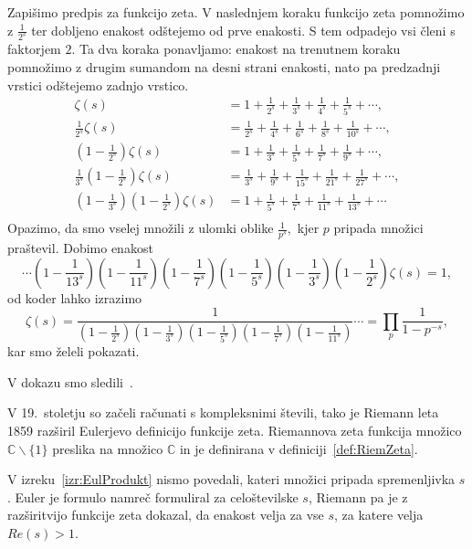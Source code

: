 \documentclass[mat1]{fmfdelo}
\begin{document}
\begin{dokaz}
Zapišimo predpis za funkcijo zeta. V naslednjem koraku funkcijo zeta pomnožimo z $\frac{1}{2^s}$ ter dobljeno enakost odštejemo od prve enakosti. S tem odpadejo vsi členi s faktorjem $2$. Ta dva koraka ponavljamo: enakost na trenutnem koraku pomnožimo z drugim sumandom na desni strani enakosti, nato pa predzadnji vrstici odštejemo zadnjo vrstico.
\begin{align*}
	\zeta(s) &= 1 + \frac{1}{2^s} + \frac{1}{3^s} + \frac{1}{4^s} + \frac{1}{5^s} + \cdots, \nonumber \\
	\frac{1}{2^s} \zeta(s) &= \frac{1}{2^s} + \frac{1}{4^s} + \frac{1}{6^s} + \frac{1}{8^s} + \frac{1}{10^s} + \cdots, \nonumber \\
	\left(1-\frac{1}{2^s}\right) \zeta(s) &= 1 + \frac{1}{3^s} + \frac{1}{5^s} + \frac{1}{7^s} + \frac{1}{9^s} + \cdots, \nonumber \\
	\frac{1}{3^s} \left(1-\frac{1}{2^s}\right) \zeta(s) &= \frac{1}{3^s} + \frac{1}{9^s} + \frac{1}{15^s} + \frac{1}{21^s} + \frac{1}{27^s} + \cdots, \nonumber \\
	\left(1-\frac{1}{3^s}\right)\left (1-\frac{1}{2^s}\right) \zeta(s) &= 1 + \frac{1}{5^s} + \frac{1}{7^s} + \frac{1}{11^s} + \frac{1}{13^s} + \cdots \nonumber \\
\end{align*}
Opazimo, da smo vselej množili z ulomki oblike $\frac{1}{p^s},$ kjer $p$ pripada množici praštevil. Dobimo enakost
	\[ \cdots \left(1-\frac{1}{13^s}\right) \left(1-\frac{1}{11^s}\right) \left(1-\frac{1}{7^s}\right) \left(1-\frac{1}{5^s}\right) \left(1-\frac{1}{3^s}\right) 		\left(1-\frac{1}{2^s}\right) \zeta(s) = 1, \]
od koder lahko izrazimo
	\[ \zeta(s) = \frac{1}{ \left(1-\frac{1}{2^s}\right) \left(1-\frac{1}{3^s}\right) \left(1-\frac{1}{5^s}\right) \left(1-\frac{1}{7^s}\right) \left(1-\frac{1}{11^s}\right)} \cdots = \prod_{p}\frac{1}{1-p^{-s}}, \]
kar smo želeli pokazati.
\end{dokaz}

V dokazu smo sledili~\cite{riemannHyp}.

V 19.~stoletju so začeli računati s kompleksnimi števili, tako je Riemann leta 1859 razširil Eulerjevo definicijo funkcije zeta. Riemannova zeta funkcija množico  $\mathbb{C}\backslash\{1\}$ preslika na množico  $\mathbb{C}$ in je definirana v definiciji~\ref{def:RiemZeta}.

\begin{opomba}
V izreku~\ref{izr:EulProdukt} nismo povedali, kateri množici pripada spremenljivka $s$. Euler je formulo namreč formuliral za celoštevilske $s$, Riemann pa je z razširitvijo funkcije zeta dokazal, da enakost velja za vse $s$, za katere velja $Re(s)>1$.
\end{opomba}
\end{document}
